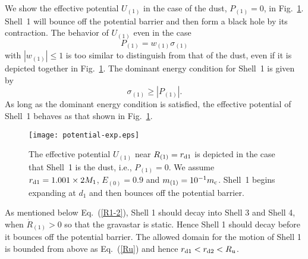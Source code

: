 \documentclass[aps,preprint,preprintnumber,nofootinbib,amsmath,amssymb,ascmac,bm,12pt]{revtex4}
\newcommand{\rdo}{r_{\rm d1}}
\newcommand{\rdt}{r_{\rm d2}}
\newcommand{\Ru}{R_{\rm u}}
\newcommand{\mo}{m_{(1)}}
\newcommand{\mc}{m_{\rm c}}
\newcommand{\Ron}{R_{(1)}}
\newcommand{\Uon}{U_{(1)}}
\newcommand{\Eze}{E_{(0)}}
\begin{document}
We show the effective potential $\Uon$ in the case of the dust, $P_{(1)}=0$,  
in Fig.~\ref{fig-potential-dust}. Shell~1 will bounce off the 
potential barrier and then form a black hole by its contraction. 
The behavior of $\Uon$ even in the case 
\begin{equation}
P_{(1)}=w_{(1)}\sigma_{(1)} \label{EOS}
\end{equation}
with $\left|w_{(1)}\right| \leq 1$ 
is too similar to distinguish from that of the dust, even if it is depicted together in Fig.~\ref{fig-potential-dust}. 
The dominant energy condition for Shell~1 is given by 
\begin{equation}
\sigma_{(1)}\geq \left|P_{(1)}\right|. \label{DE-cond}
\end{equation}
As long as the dominant energy condition is satisfied, the effective potential of Shell~1 behaves 
as that shown in Fig.~\ref{fig-potential-dust}. 

\begin{figure}[htbp]
 \begin{center}
 \texttt{[image: potential-exp.eps]}
 \end{center}
 \caption{
The effective potential $U_{(1)}$ near $\Ron=\rdo$ is depicted in the case that Shell~1 is the dust, i.e., 
$P_{(1)}=0$. We assume $\rdo=1.001 \times 2M_1$, $\Eze=0.9$ and $\mo=10^{-1}\mc$. 
Shell~1 begins expanding at $d_1$ and then bounces off the potential barrier. }
 \label{fig-potential-dust}
\end{figure}

As mentioned below Eq.~(\ref{R1-2}), 
Shell 1 should decay into Shell 3 and Shell 4, when $\dot{R}_{(1)}>0$ so that the gravastar is static. 
Hence Shell 1 should decay before it bounces off the potential barrier. The allowed domain 
for the motion of Shell 1 is bounded from above as Eq.~(\ref{Ru}) 
and hence $\rdo<\rdt<\Ru$. 
\end{document}
